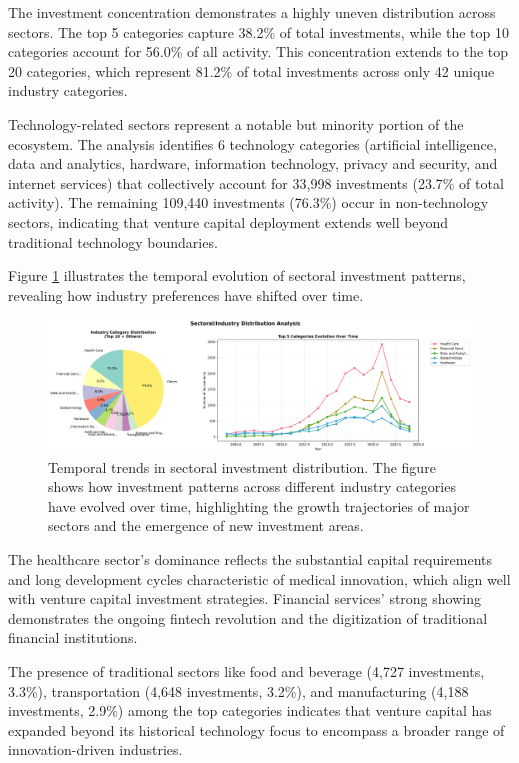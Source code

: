 The investment concentration demonstrates a highly uneven distribution across sectors. The top 5 categories capture 38.2\% of total investments, while the top 10 categories account for 56.0\% of all activity. This concentration extends to the top 20 categories, which represent 81.2\% of total investments across only 42 unique industry categories.

Technology-related sectors represent a notable but minority portion of the ecosystem. The analysis identifies 6 technology categories (artificial intelligence, data and analytics, hardware, information technology, privacy and security, and internet services) that collectively account for 33,998 investments (23.7\% of total activity). The remaining 109,440 investments (76.3\%) occur in non-technology sectors, indicating that venture capital deployment extends well beyond traditional technology boundaries.

Figure \ref{fig:sectoral_industry_trends} illustrates the temporal evolution of sectoral investment patterns, revealing how industry preferences have shifted over time.

\begin{figure}[htbp]
\centering
\includegraphics[width=1\textwidth]{../figures/us/sectoral_industry_analysis_trends.png}
\caption{Temporal trends in sectoral investment distribution. The figure shows how investment patterns across different industry categories have evolved over time, highlighting the growth trajectories of major sectors and the emergence of new investment areas.}
\label{fig:sectoral_industry_trends}
\end{figure}

The healthcare sector's dominance reflects the substantial capital requirements and long development cycles characteristic of medical innovation, which align well with venture capital investment strategies. Financial services' strong showing demonstrates the ongoing fintech revolution and the digitization of traditional financial institutions.

The presence of traditional sectors like food and beverage (4,727 investments, 3.3\%), transportation (4,648 investments, 3.2\%), and manufacturing (4,188 investments, 2.9\%) among the top categories indicates that venture capital has expanded beyond its historical technology focus to encompass a broader range of innovation-driven industries.

